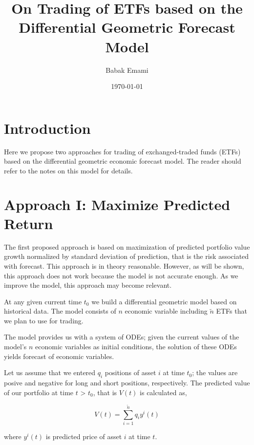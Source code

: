 \documentclass{article}
\title{On Trading of ETFs based on the Differential Geometric Forecast Model}
\author{Babak Emami}
\date{\today}
\begin{document}
\maketitle

\begin{abstract}


\end{abstract}

\section{Introduction}\label{section:introduction}

Here we propose two approaches for trading of exchanged-traded
funds (ETFs) based on the differential geometric economic forecast
model. The reader should refer to the notes on this model for details.

\section{Approach I: Maximize Predicted Return}\label{section:approach-1}

The first proposed approach is based on maximization of predicted
portfolio value growth normalized by standard deviation of prediction,
that is the risk associated with forecast. This approach is in theory
reasonable. However, as will be shown, this approach does not work
because the model is not accurate enough. As we improve the model,
this approach may become relevant.

At any given current time $t_{0}$ we build a differential geometric
model based on historical data. The model consists of $n$ economic
variable including $\tilde{n}$ ETFs that we plan to use for trading.

The model provides us with a system of ODEs; given the current values
of the model's $n$ economic variables as initial conditions, the
solution of these ODEs yields forecast of economic variables.

Let us assume that we entered $q_{i}$ positions of asset $i$ at time
$t_{0}$; the values are posive and negative for long and short
positions, respectively. The predicted value of our portfolio at time
$t$ > $t_{0}$, that is $V(t)$ is calculated as,

\begin{equation}\label{eqn:prt-value}
V(t) = \sum_{i=1}^{\tilde{n}} q_{i} y^{i}(t)
\end{equation}

where $y^{i}(t)$ is predicted price of asset $i$ at time $t$. 
\end{document}
